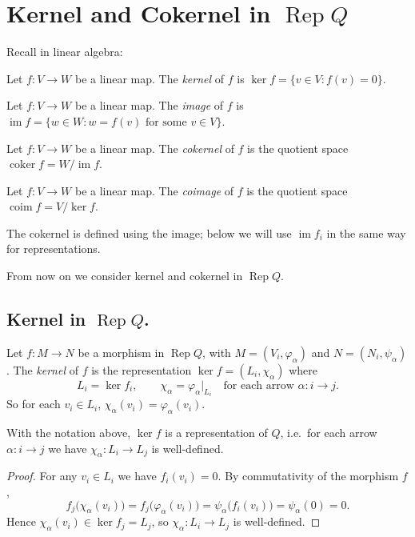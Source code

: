 \documentclass[11pt, a4paper]{report}
\begin{document}
\section{Kernel and Cokernel in \texorpdfstring{$\operatorname{Rep}Q$}{Rep Q}}

Recall in linear algebra:
\begin{definition}
    Let \(f: V \to W\) be a linear map. The \emph{kernel} of \(f\) is \(\operatorname{ker}f = \{ v \in V : f(v) = 0 \}\).
\end{definition}
\begin{definition}
    Let \(f: V \to W\) be a linear map. The \emph{image} of \(f\) is \(\operatorname{im}f = \{ w \in W : w = f(v) \text{ for some } v \in V \}\).
\end{definition}
\begin{definition}
    Let \(f: V \to W\) be a linear map. The \emph{cokernel} of \(f\) is the quotient space \(\operatorname{coker}f = W / \operatorname{im}f\).
\end{definition}
\begin{definition}
    Let \(f: V \to W\) be a linear map. The \emph{coimage} of \(f\) is the quotient space \(\operatorname{coim}f = V / \operatorname{ker}f\).
\end{definition}
The cokernel is defined using the image; below we will use \(\operatorname{im}f_i\) in the same way for representations.

From now on we consider kernel and cokernel in \(\operatorname{Rep}Q\).

\subsection{Kernel in \texorpdfstring{\(\operatorname{Rep}Q\)}{Rep Q}.}

\begin{definition}
    Let \(f: M \to N\) be a morphism in \(\operatorname{Rep}Q\), with \(M = (V_i, \varphi_\alpha)\) and \(N = (N_i, \psi_\alpha)\). The \emph{kernel} of \(f\) is the representation \(\operatorname{ker}f = (L_i, \chi_\alpha)\) where
    \[
        L_i = \operatorname{ker}f_i, \qquad \chi_\alpha = \varphi_\alpha|_{L_i} \quad \text{for each arrow } \alpha: i \to j.
    \]
    So for each \(v_i \in L_i\), \(\chi_\alpha(v_i) = \varphi_\alpha(v_i)\).
\end{definition}

\begin{lemma}
    With the notation above, \(\operatorname{ker}f\) is a representation of \(Q\), i.e.\ for each arrow \(\alpha: i \to j\) we have \(\chi_\alpha: L_i \to L_j\) is well-defined.
\end{lemma}
\begin{proof}
    For any \(v_i \in L_i\) we have \(f_i(v_i) = 0\). By commutativity of the morphism \(f\),
    \[
        f_j\bigl(\chi_\alpha(v_i)\bigr) = f_j\bigl(\varphi_\alpha(v_i)\bigr) = \psi_\alpha\bigl(f_i(v_i)\bigr) = \psi_\alpha(0) = 0.
    \]
    Hence \(\chi_\alpha(v_i) \in \operatorname{ker}f_j = L_j\), so \(\chi_\alpha: L_i \to L_j\) is well-defined.
\end{proof}
\end{document}
